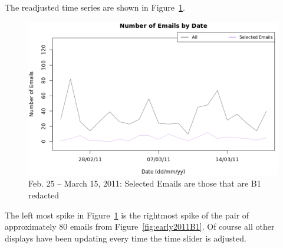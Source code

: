 \documentclass[journal]{vgtc}                %
\begin{document}
The readjusted time series are shown in Figure~\ref{fig:EmailVolumeB1LibyaBuildup}.
\begin{figure}[h]
\begin{center}
\includegraphics[width=0.95\linewidth]{EmailVolumeB1LibyaBuildup}
\caption{Feb. 25 -- March 15, 2011:  Selected Emails are those that are B1 redacted}
\label{fig:EmailVolumeB1LibyaBuildup}
\end{center}
\end{figure}
The left most spike in Figure~\ref{fig:EmailVolumeB1LibyaBuildup}  is the rightmost spike of the pair of approximately 80 emails from Figure~\ref{fig:early2011B1}.   
Of course all other displays have been updating every time the time slider is adjusted.  
\end{document}
